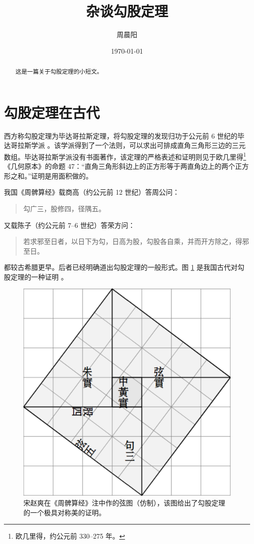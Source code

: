 \documentclass[UTF8]{ctexart}
\title{\heiti 杂谈勾股定理}
\author{\kaishu 周晨阳}
\date{\today}
\begin{document}
\maketitle

\begin{abstract}
  这是一篇关于勾股定理的小短文。
\end{abstract}

\tableofcontents

\section{勾股定理在古代}
西方称勾股定理为毕达哥拉斯定理，将勾股定理的发现归功于公元前 6 世纪的毕达哥拉斯学派 \cite{Kline}。该学派得到了一个法则，可以求出可排成直角三角形三边的三元数组。毕达哥拉斯学派没有书面著作，该定理的严格表述和证明则见于欧几里得\footnote{欧几里得，约公元前 330--275 年。}《几何原本》的命题 47：“直角三角形斜边上的正方形等于两直角边上的两个正方形之和。”证明是用面积做的。

我国《周髀算经》载商高（约公元前 12 世纪）答周公问：

\begin{quote}
  \kaishu 勾广三，股修四，径隅五。
\end{quote}

又载陈子（约公元前 7--6 世纪）答荣方问：

\begin{quote}
  \kaishu 若求邪至日者，以日下为勾，日高为股，勾股各自乘，并而开方除之，得邪至日。
\end{quote}

都较古希腊更早。后者已经明确道出勾股定理的一般形式。图 \ref{fig:xiantu} 是我国古代对勾股定理的一种证明 \cite{quanjing}。

\begin{figure}[ht]
  \centering
  \includegraphics[scale=0.4]{xiantu.png}
  \caption{宋赵爽在《周髀算经》注中作的弦图（仿制），该图给出了勾股定理的一个极具对称美的证明。}
  \label{fig:xiantu}
\end{figure}
\end{document}
